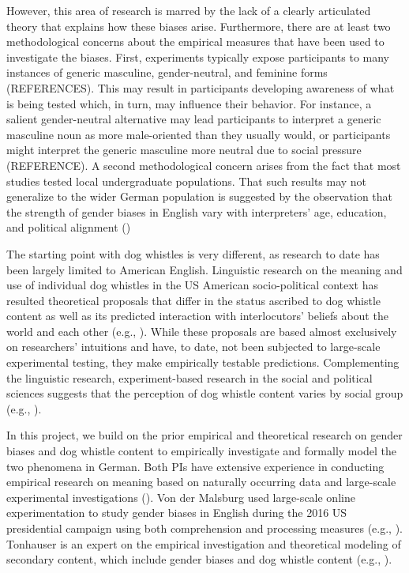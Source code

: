 \documentclass[11pt]{article}
\begin{document}
However, this area of research is marred by the lack of a clearly articulated theory that explains how these biases arise. Furthermore, there are at least two methodological concerns about the empirical measures that have been used to investigate the biases. First, experiments typically expose participants to many instances of generic masculine, gender-neutral, and feminine forms (REFERENCES). This may result in participants developing awareness of what is being tested which, in turn, may influence their behavior. For instance, a salient gender-neutral alternative may lead participants to interpret a generic masculine noun as more male-oriented than they usually would, or participants might interpret the generic masculine more neutral due to social pressure (REFERENCE). A second methodological concern arises from the fact that most studies tested local undergraduate populations. That such results may not generalize to the wider German population is suggested by the observation that the strength of gender biases in English vary with interpreters' age, education, and political alignment (\cite{MalsburgEtAl2020}) 

The starting point with dog whistles is very different, as research to date has been largely limited to American English. Linguistic research on the meaning and use of individual dog whistles in the US American socio-political context has resulted theoretical proposals that differ in the status ascribed to dog whistle content as well as its predicted interaction with interlocutors' beliefs about the world and each other (e.g., \cite{stanleyxxx,burnett2017,khoo2017,HendersonMcCready2018,saul2018}). While these proposals are based almost exclusively on researchers' intuitions and have, to date, not been subjected to large-scale experimental testing, they make empirically testable predictions. Complementing the linguistic research, experiment-based research in the social and political sciences suggests that the perception of dog whistle content varies by social group (e.g., \cite{Calfano and Djupe 2008,albertson2015,goodwin-saward2005,hurwitz-peffley2005,wetts-willer2019}). 

In this project, we build on the prior empirical and theoretical research on gender biases and dog whistle content to empirically investigate and formally model the two phenomena in German. Both PIs have extensive experience in conducting empirical research on meaning based on naturally occurring data and large-scale experimental investigations (\cite{demarneffe-etal-sub23,degen-tonhauser-managing:to-appear}). Von der Malsburg used large-scale online experimentation to study gender biases in English during the 2016 US presidential campaign using both comprehension and processing measures (e.g., \cite{BoyceEtAl2019LSA,MalsburgEtAl2020}). Tonhauser is an expert on the empirical investigation and theoretical modeling of secondary content, which include gender biases and dog whistle content (e.g., \cite{tonhauser-sula6,brst-lang11,tbd-variability}).
\end{document}
